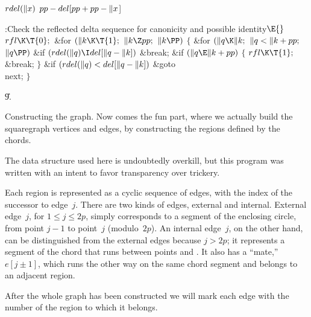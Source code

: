 \Y\B\4\D$\\{rdel}(\|x)$ \5
$\\{pp}-\\{del}[\\{pp}+\\{pp}-\|x{}$]\par
\Y\B\4:Check the reflected delta sequence for canonicity and possible
identity\X${}\E{}$\6
$\\{rfl}\K\T{0};{}$\6
\&{for} ${}(\|k\K\T{1};{}$ ${}\|k\Z\\{pp};{}$ ${}\|k\PP){}$\5
${}\{{}$\1\6
\&{for} ${}(\|q\K\|k;{}$ ${}\|q<\|k+\\{pp};{}$ ${}\|q\PP){}$\1\6
\&{if} ${}(\\{rdel}(\|q)\I\\{del}[\|q-\|k]){}$\1\5
\&{break};\2\2\6
\&{if} ${}(\|q\E\|k+\\{pp}){}$\5
${}\{{}$\1\6
${}\\{rfl}\K\T{1};{}$\6
\&{break};\6
\4${}\}{}$\2\6
\&{if} ${}(\\{rdel}(\|q)<\\{del}[\|q-\|k]){}$\1\5
\&{goto} \\{next};\2\6
\4${}\}{}$\2\par
\U9.\fi

Constructing the graph. Now comes the fun part, where we actually
build the squaregraph vertices and edges, by constructing the regions
defined by the chords.

The data structure used here is undoubtedly overkill, but this program
was written with an intent to favor transparency over trickery.

Each region is represented as a cyclic sequence of edges, with
 the index of the successor to edge~$j$. There are two
kinds of edges, external and internal. External edge~$j$, for
$1\le j\le2p$, simply corresponds to a segment of the enclosing circle,
from point $j-1$ to point~$j$ (modulo~$2p$). An internal edge~$j$, on the
other hand, can be distinguished from the external edges because $j>2p$;
it represents a segment of the chord that runs between points 
and . It also has a ``mate,'' $e[j\pm1]$, which runs the
other way on the same chord segment and belongs to an adjacent region.

After the whole graph has been constructed we will mark each edge
with the number of the region to which it belongs.


